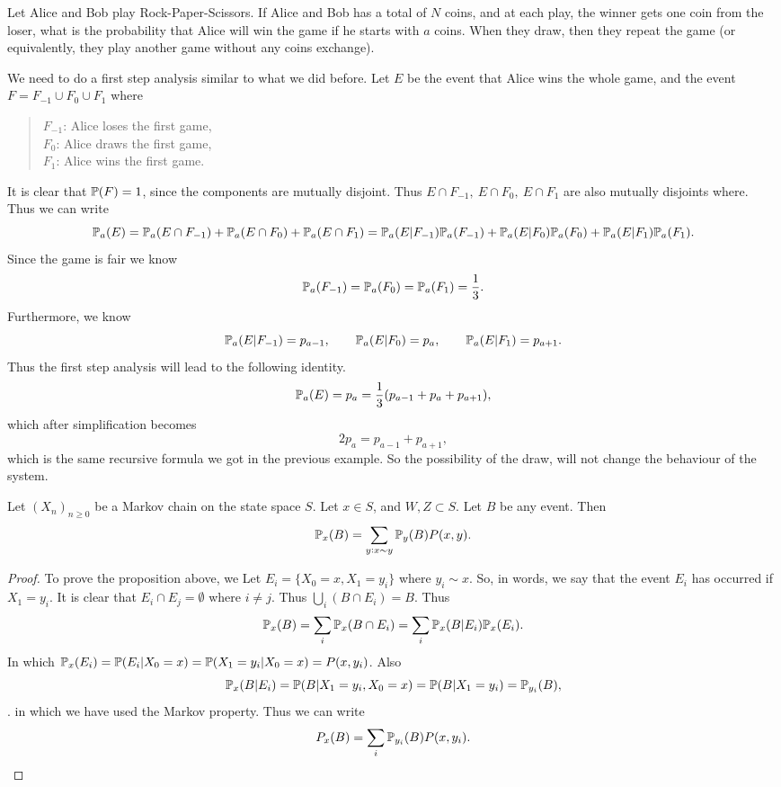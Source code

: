 \begin{example}
	Let Alice and Bob play Rock-Paper-Scissors. If Alice and Bob has a total of $N$ coins, and at each play, the winner gets one coin from the loser, what is the probability that Alice will win the game if he starts with $a$ coins. When they draw, then they repeat the game (or equivalently, they play another game without any coins exchange).
	
	\begin{solution}
		We need to do a first step analysis similar to what we did before. Let $E$ be the event that Alice wins the whole game, and the event $F=F_{-1}\cup F_0 \cup F_1$ where
		\begin{quote}
			$F_{-1}$: Alice loses the first game,\\
			$F_0$: Alice draws the first game,\\
			$F_1$: Alice wins the first game.
		\end{quote}
		It is clear that $\mathbb{P}(F) = 1$, since the components are mutually disjoint. Thus $E\cap F_{-1},\ E\cap F_0,\ E\cap F_1$ are also mutually disjoints where. Thus we can write
		\[\mathbb{P}_a(E) = \mathbb{P}_a(E\cap F_{-1}) + \mathbb{P}_a(E\cap F_0) + \mathbb{P}_a(E\cap F_1)
				= \mathbb{P}_a(E|F_{-1})\mathbb{P}_a(F_{-1}) + \mathbb{P}_a(E|F_0)\mathbb{P}_a(F_0) + \mathbb{P}_a(E|F_1)\mathbb{P}_a(F_1).
		\]
		Since the game is fair we know
		\[ \mathbb{P}_a(F_{-1}) = \mathbb{P}_a(F_0) = \mathbb{P}_a(F_1) = \frac{1}{3}.  \]
		Furthermore, we know
		\[ \mathbb{P}_a(E|F_{-1}) = p_{a-1}, \qquad \mathbb{P}_a(E|F_0) = p_a, \qquad \mathbb{P}_a(E|F_1) = p_{a+1}. \]
		Thus the first step analysis will lead to the following identity.
		\[  \mathbb{P}_a(E) = p_a = \frac{1}{3} ( p_{a-1} + p_{a} + p_{a+1}),\]
		which after simplification becomes
		\[ 2p_a = p_{a-1} + p_{a+1}, \]
		which is the same recursive formula we got in the previous example. So the possibility of the draw, will not change the behaviour of the system.
	\end{solution}
\end{example}


\begin{proposition}
	Let $(X_n)_{n\geq 0}$ be a Markov chain on the state space $S$. Let $x\in S$, and $W,Z \subset S$. Let $B$ be any event. Then
	\[ \mathbb{P}_x(B) = \sum_{y:x\sim y} \mathbb{P}_y(B)P(x,y). \]
	\label{prop:FirstTimeStepArgument}
\end{proposition}
\begin{proof}
	To prove the proposition above, we Let $E_i = \{ X_0=x, X_1=y_i \}$ where $y_i \sim x$. So, in words, we say that the event $E_i$ has occurred if $X_1 = y_i$. It is clear that $E_i \cap E_j = \emptyset$ where $i\neq j$. Thus $\bigcup_{i}(B\cap E_i) = B$. Thus 
	\[ \mathbb{P}_x(B) = \sum_{i} \mathbb{P}_x(B \cap E_i) = \sum_{i}\mathbb{P}_x(B|E_i)\mathbb{P}_x(E_i). \]
	In which $\mathbb{P}_x(E_i) = \mathbb{P}(E_i|X_0=x) = \mathbb{P}(X_1=y_i|X_0=x) = P(x,y_i)  $. Also \[\mathbb{P}_x(B|E_i) = \mathbb{P}(B|X_1=y_i, X_0=x) = \mathbb{P}(B|X_1=y_i) = \mathbb{P}_{y_i}(B),\].
	in which we have used the Markov property. Thus we can write
	\[ P_x(B) = \sum_i \mathbb{P}_{y_i}(B)P(x,y_i). \]
\end{proof}


